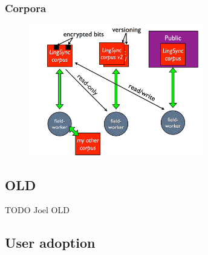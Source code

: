 \documentclass{beamer}
\begin{document}
\begin{frame}
\frametitle{Corpora}
\begin{figure}
\begin{center}
\includegraphics[width=3in]{../figures/corpora}
\label{lingsync:corpora}
\end{center}
\end{figure}
\end{frame}

\subsection{OLD}\label{sec:old}

\begin{frame}
TODO Joel OLD
\end{frame}


\subsection{User adoption}
\end{document}
